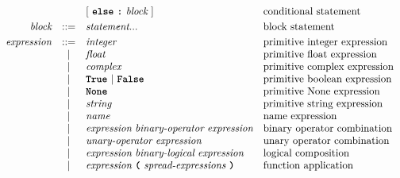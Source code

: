 \[\begin{array}{rcll}
                            &     & [\ \term{else}\ \term{:}\ \textit{block}\ ]                                                    & \text{conditional statement}            \\[1mm]
\textit{block}              & ::= & \textit{statement}...                                                                    & \text{block statement}                  \\[1mm]
\textit{expression}         & ::= & \textit{integer}                                                                         & \text{primitive integer expression}     \\
                            & |   & \textit{float}                                                                           & \text{primitive float expression}       \\
                            & |   & \textit{complex}                                                                         & \text{primitive complex expression}     \\
                            & |   & \term{True}\ |\ \term{False}                                                             & \text{primitive boolean expression}     \\
                            & |   & \term{None}                                                                              & \text{primitive None expression}        \\
                            & |   & \textit{string}                                                                          & \text{primitive string expression}      \\
                            & |   & \textit{name}                                                                            & \text{name expression}                  \\
                            & |   & \textit{expression}\ \textit{binary-operator}\ \textit{expression}                       & \text{binary operator combination}      \\
                            & |   & \textit{unary-operator}\ \textit{expression}                                             & \text{unary operator combination}       \\
                            & |   & \textit{expression}\ \textit{binary-logical}\ \textit{expression}                        & \text{logical composition}              \\
                            & |   & \textit{expression}\ \term{(}\ \textit{spread-expressions}\ \term{)}                     & \text{function application}             \\

\end{array}\]

